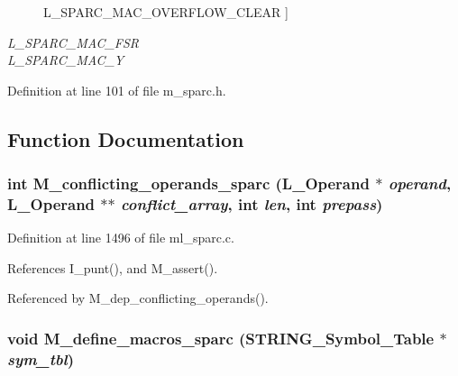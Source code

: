 \begin{Desc}
\begin{description}
{L\_\-SPARC\_\-MAC\_\-OVERFLOW\_\-CLEAR\label{m__sparc_8h_c36f475ca5b446f4fde4c9b90bec77c869f2d4ef9a3528d236852e2bcff8da51}
}]\item[{\em 
L\_\-SPARC\_\-MAC\_\-FSR\label{m__sparc_8h_c36f475ca5b446f4fde4c9b90bec77c83c493176003a98b2ab862e353946f253}
}]\item[{\em 
L\_\-SPARC\_\-MAC\_\-Y\label{m__sparc_8h_c36f475ca5b446f4fde4c9b90bec77c8cef7aa1fdf7fc56045811dad0081a16b}
}]\end{description}
\end{Desc}



Definition at line 101 of file m\_\-sparc.h.

\subsection{Function Documentation}
\subsubsection{\setlength{\rightskip}{0pt plus 5cm}int M\_\-conflicting\_\-operands\_\-sparc (L\_\-Operand $\ast$ {\em operand}, L\_\-Operand $\ast$$\ast$ {\em conflict\_\-array}, int {\em len}, int {\em prepass})}\label{m__sparc_8h_74e8faecdc28492f0582753ab26f71c0}




Definition at line 1496 of file ml\_\-sparc.c.

References I\_\-punt(), and M\_\-assert().

Referenced by M\_\-dep\_\-conflicting\_\-operands().
\subsubsection{\setlength{\rightskip}{0pt plus 5cm}void M\_\-define\_\-macros\_\-sparc (\bf{STRING\_\-Symbol\_\-Table} $\ast$ {\em sym\_\-tbl})}\label{m__sparc_8h_e664de7899500ee62b3ce59710006d2a}




